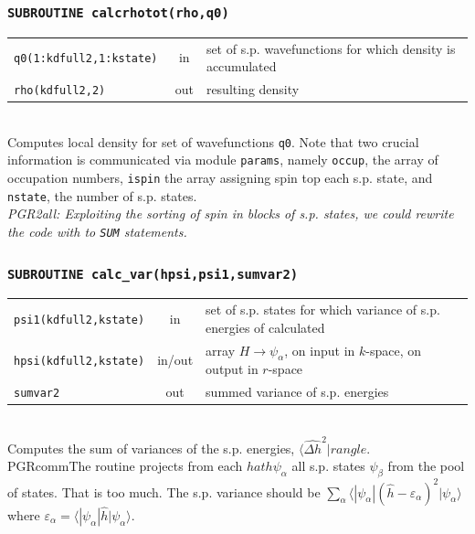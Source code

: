 \documentclass[final,1p]{elsarticle}
\newcommand{\PGRcomm}[1]{{\color{blue}\small\em PGR2all: #1}}
\begin{document}
\subsubsection*{\tt SUBROUTINE calcrhotot(rho,q0)}
\begin{tabular}{lcl}
 {\tt q0(1:kdfull2,1:kstate) } & in & set of s.p. wavefunctions for
 which density is accumulated\\
 {\tt rho(kdfull2,2)} & out & resulting density\\
\end{tabular}
\\[4pt]
Computes local density for set of wavefunctions {\tt q0}. Note that
two crucial information is communicated via module {\tt params}, namely
{\tt occup}, the array of occupation numbers, {\tt ispin} the
array assigning spin top each s.p. state, and {\tt nstate}, the number
of s.p. states.
\\
\PGRcomm{Exploiting the sorting of spin in blocks of s.p. states, we
  could rewrite the code with to {\tt SUM} statements.}


\subsubsection*{\tt SUBROUTINE calc\_var(hpsi,psi1,sumvar2)}
\begin{tabular}{lcl}
 {\tt psi1(kdfull2,kstate)}& in & set of s.p. states for which
 variance of s.p. energies of calculated\\
 {\tt hpsi(kdfull2,kstate)} & in/out & array
 $H\rightarrow\psi_\alpha$, on input in $k$-space, on output in $r$-space
\\
 {\tt sumvar2} & out  & summed variance of s.p. energies\\
\end{tabular}
\\[4pt]
Computes the sum of variances of the s.p. energies,
$\langle\hat{\Delta h}^2|rangle$. 
\\
PGRcomm{The routine projects from each $hat{h}\psi_\alpha$
all s.p. states $\psi_\beta$ from the pool of states. That is too
much. The s.p. variance should be
$\sum_\alpha\langle|\psi_\alpha|(\hat{h}-\varepsilon_\alpha)^2|\psi_\alpha\rangle$
where $\varepsilon_\alpha=\langle|\psi_\alpha|\hat{h}|\psi_\alpha\rangle$.}
\end{document}
